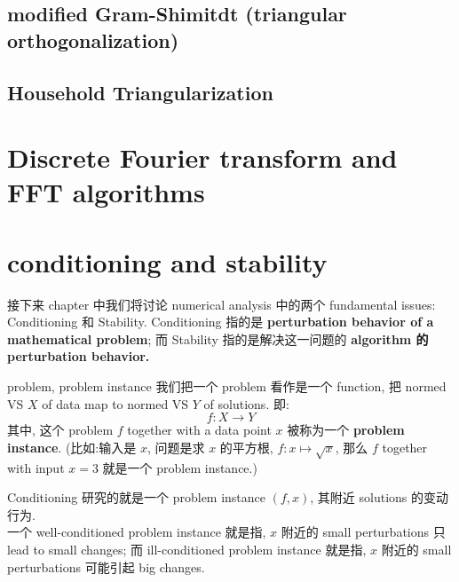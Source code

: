\documentclass[lang=cn,11pt]{elegantbook}
\begin{document}
\section{modified Gram-Shimitdt (triangular orthogonalization)}





\section{Household Triangularization}






\chapter{Discrete Fourier transform and FFT algorithms}









\chapter{conditioning and stability\cite{doi:10.1137/1.9780898719574.ch3}}
接下来 chapter 中我们将讨论 numerical analysis 中的两个 fundamental issues: Conditioning 和 Stability. Conditioning 指的是 \textbf{perturbation behavior of a mathematical problem}; 而 Stability 指的是解决这一问题的 \textbf{algorithm 的 perturbation behavior.}

\begin{definition}{problem, problem instance}
我们把一个 problem 看作是一个 function, 把 normed VS $X$ of data map to normed VS $Y$ of solutions. 即: \[
f: X \to Y
\]    
其中, 这个 problem $f$ together with a data point $x$ 被称为一个 \textbf{problem instance}. (比如:输入是 $x$, 问题是求 $x$ 的平方根, $f: x\mapsto \sqrt{x}$, 那么 $f$ together with input $x=3$ 就是一个 problem instance.)
\end{definition}

Conditioning 研究的就是一个 problem instance $(f,x)$, 其附近 solutions 的变动行为.\\
一个 well-conditioned problem instance 就是指, $x$ 附近的 small perturbations 只 lead to small changes; 而 ill-conditioned problem instance 就是指, $x$ 附近的 small perturbations 可能引起 big changes. 
\end{document}
